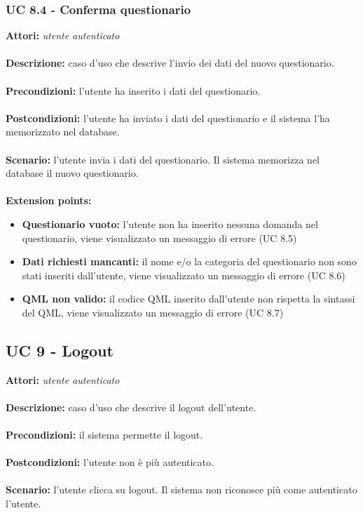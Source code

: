 \documentclass[a4paper,11pt]{article}
\begin{document}
\subsubsection{UC 8.4 - Conferma questionario}

\textbf{Attori:} \textit{utente autenticato}
\\ \\
\textbf{Descrizione:} caso d'uso che descrive l'invio dei dati del nuovo questionario.\\
\\
\textbf{Precondizioni:} l'utente ha inserito i dati del questionario.\\
\\
\textbf{Postcondizioni:} l’utente ha inviato i dati del questionario e il sistema l'ha memorizzato nel database.\\
\\
\textbf{Scenario:} l’utente invia i dati del questionario. Il sistema memorizza nel database il nuovo questionario.\\
\\
\textbf{Extension points:} 
\begin{itemize}
	\item \textbf{Questionario vuoto:} l'utente non ha inserito nessuna domanda nel questionario, viene visualizzato un messaggio di errore (UC 8.5)
	\item \textbf{Dati richiesti mancanti:} il nome e/o la categoria del questionario non sono stati inseriti dall'utente, viene visualizzato un messaggio di errore (UC 8.6)
	\item \textbf{QML non valido:} il codice QML inserito dall'utente non rispetta la sintassi del QML, viene visualizzato un messaggio di errore (UC 8.7)
\end{itemize}


\subsection{UC 9 - Logout}

\textbf{Attori:} \textit{utente autenticato}
\\ \\
\textbf{Descrizione:} caso d'uso che descrive il logout dell'utente.\\
\\
\textbf{Precondizioni:} il sistema permette il logout.\\
\\
\textbf{Postcondizioni:} l’utente non è più autenticato.\\
\\
\textbf{Scenario:} l’utente clicca su logout. Il sistema non riconosce più come autenticato l'utente.\\
	
\end{document}
